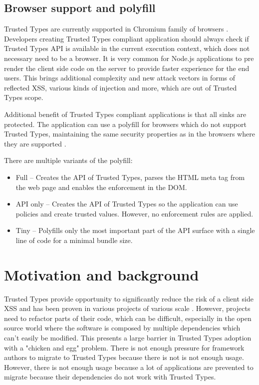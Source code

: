 \subsection{Browser support and polyfill}

Trusted Types are currently supported in Chromium family of browsers \cite{mdn:tt_compatibility}.
Developers creating Trusted Types compliant application should always check if Trusted Types API is
available in the current execution context, which does not necessary need to be a browser. It is
very common for Node.js applications to pre render the client side code on the server to provide
faster experience for the end users. This brings additional complexity and new attack vectors in
forms of reflected XSS, various kinds of injection and more, which are out of Trusted Types scope.

Additional benefit of Trusted Types compliant applications is that all sinks are protected. The
application can use a polyfill for browsers which do not support Trusted Types, maintaining the same
security properties as in the browsers where they are supported \cite{xss_nowhere_with_polyfill}.

There are multiple variants of the polyfill:

\begin{itemize}
  \item Full -- Creates the API of Trusted Types, parses the HTML meta tag from the web page
        and enables the enforcement in the DOM.
  \item API only -- Creates the API of Trusted Types so the application can use policies and create
        trusted values. However, no enforcement rules are applied.
  \item Tiny -- Polyfills only the most important part of the API surface with a single line of code
        for a minimal bundle size.
\end{itemize}

\section{Motivation and background}

Trusted Types provide opportunity to significantly reduce the risk of a client side XSS and has been
proven in various projects of various scale \cite{tt_web_framework_paper}
\cite{tt_integration_list}. However, projects need to refactor parts of their code, which can be
difficult, especially in the open source world where the software is composed by multiple
dependencies which can't easily be modified. This presents a large barrier in Trusted Types adoption
\cite{tt_web_framework_paper} with a "chicken and egg" problem. There is not enough pressure for
framework authors to migrate to Trusted Types because there is not is not enough usage. However,
there is not enough usage because a lot of applications are prevented to migrate because their
dependencies do not work with Trusted Types.

